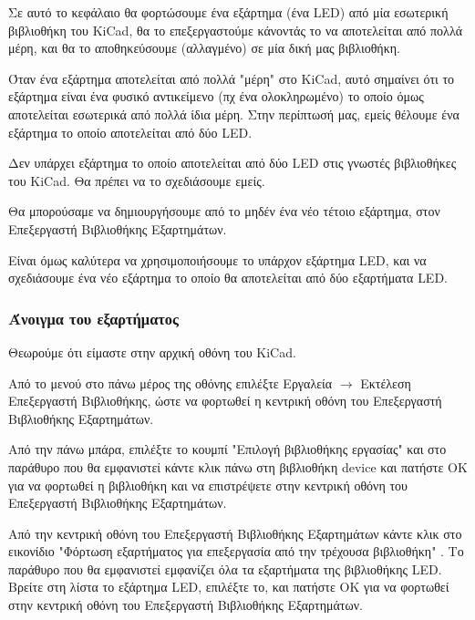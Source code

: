 \documentclass[a4paper]{article}
\begin{document}
Σε αυτό το κεφάλαιο θα φορτώσουμε ένα εξάρτημα (ένα \textenglish{LED}) από μία εσωτερική βιβλιοθήκη του \textenglish{KiCad}, θα το επεξεργαστούμε κάνοντάς το να αποτελείται από πολλά μέρη, και θα το αποθηκεύσουμε (αλλαγμένο) σε μία δική μας βιβλιοθήκη.

Όταν ένα εξάρτημα αποτελείται από πολλά "μέρη" στο \textenglish{KiCad}, αυτό σημαίνει ότι το εξάρτημα είναι ένα φυσικό αντικείμενο (πχ ένα ολοκληρωμένο) το οποίο όμως αποτελείται εσωτερικά από πολλά ίδια μέρη. Στην περίπτωσή μας, εμείς θέλουμε ένα εξάρτημα το οποίο αποτελείται από δύο \textenglish{LED}.

Δεν υπάρχει εξάρτημα το οποίο αποτελείται από δύο \textenglish{LED} στις γνωστές βιβλιοθήκες του \textenglish{KiCad}. Θα πρέπει να το σχεδιάσουμε εμείς.

Θα μπορούσαμε να δημιουργήσουμε από το μηδέν ένα νέο τέτοιο εξάρτημα, στον Επεξεργαστή Βιβλιοθήκης Εξαρτημάτων. 

Είναι όμως καλύτερα να χρησιμοποιήσουμε το υπάρχον εξάρτημα \textenglish{LED}, και να σχεδιάσουμε ένα νέο εξάρτημα το οποίο θα αποτελείται από δύο εξαρτήματα \textenglish{LED}.

\subsubsection{Άνοιγμα του εξαρτήματος}
Θεωρούμε ότι είμαστε στην αρχική οθόνη του \textenglish{KiCad}. 

Από το μενού στο πάνω μέρος της οθόνης επιλέξτε Εργαλεία $\rightarrow$ Εκτέλεση Επεξεργαστή Βιβλιοθήκης, ώστε να φορτωθεί η κεντρική οθόνη του Επεξεργαστή Βιβλιοθήκης Εξαρτημάτων.

\begin{figure}
  \begin{center}
    \label{fig:kicad-main}
  \end{center}
\end{figure}

Από την πάνω μπάρα, επιλέξτε το κουμπί "Επιλογή βιβλιοθήκης εργασίας" και στο παράθυρο που θα εμφανιστεί κάντε κλικ πάνω στη βιβλιοθήκη device και πατήστε ΟΚ για να φορτωθεί η βιβλιοθήκη και να επιστρέψετε στην κεντρική οθόνη του Επεξεργαστή Βιβλιοθήκης Εξαρτημάτων.

Από την κεντρική οθόνη του Επεξεργαστή Βιβλιοθήκης Εξαρτημάτων κάντε κλικ στο εικονίδιο "Φόρτωση εξαρτήματος για επεξεργασία από την τρέχουσα βιβλιοθήκη" %
. Το παράθυρο που θα εμφανιστεί εμφανίζει όλα τα εξαρτήματα της βιβλιοθήκης \textenglish{LED}. Βρείτε στη λίστα το εξάρτημα \textenglish{LED}, επιλέξτε το, και πατήστε ΟΚ για να φορτωθεί στην κεντρική οθόνη του Επεξεργαστή Βιβλιοθήκης Εξαρτημάτων.
\end{document}
